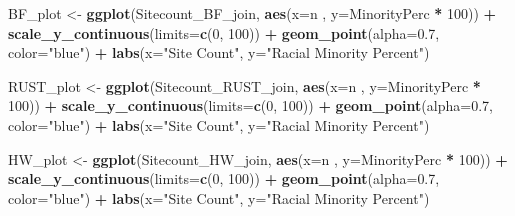 \documentclass[12pt,]{article}
\newenvironment{Shaded}{\begin{snugshade}}{\end{snugshade}}
\newcommand{\KeywordTok}[1]{\textcolor[rgb]{0.13,0.29,0.53}{\textbf{#1}}}
\newcommand{\DataTypeTok}[1]{\textcolor[rgb]{0.13,0.29,0.53}{#1}}
\newcommand{\DecValTok}[1]{\textcolor[rgb]{0.00,0.00,0.81}{#1}}
\newcommand{\FloatTok}[1]{\textcolor[rgb]{0.00,0.00,0.81}{#1}}
\newcommand{\StringTok}[1]{\textcolor[rgb]{0.31,0.60,0.02}{#1}}
\newcommand{\OperatorTok}[1]{\textcolor[rgb]{0.81,0.36,0.00}{\textbf{#1}}}
\newcommand{\NormalTok}[1]{#1}
\begin{document}
\begin{Shaded}
\begin{Highlighting}[]
\NormalTok{BF_plot <-}\StringTok{ }
\StringTok{  }\KeywordTok{ggplot}\NormalTok{(Sitecount_BF_join, }\KeywordTok{aes}\NormalTok{(}\DataTypeTok{x=}\NormalTok{n , }\DataTypeTok{y=}\NormalTok{MinorityPerc }\OperatorTok{*}\StringTok{ }\DecValTok{100}\NormalTok{)) }\OperatorTok{+}
\StringTok{  }\KeywordTok{scale_y_continuous}\NormalTok{(}\DataTypeTok{limits=}\KeywordTok{c}\NormalTok{(}\DecValTok{0}\NormalTok{, }\DecValTok{100}\NormalTok{)) }\OperatorTok{+}
\StringTok{  }\KeywordTok{geom_point}\NormalTok{(}\DataTypeTok{alpha=}\FloatTok{0.7}\NormalTok{, }\DataTypeTok{color=}\StringTok{"blue"}\NormalTok{) }\OperatorTok{+}
\StringTok{  }\KeywordTok{labs}\NormalTok{(}\DataTypeTok{x=}\StringTok{"Site Count"}\NormalTok{, }\DataTypeTok{y=}\StringTok{"Racial Minority Percent"}\NormalTok{)}

\NormalTok{RUST_plot <-}\StringTok{ }
\StringTok{  }\KeywordTok{ggplot}\NormalTok{(Sitecount_RUST_join, }\KeywordTok{aes}\NormalTok{(}\DataTypeTok{x=}\NormalTok{n , }\DataTypeTok{y=}\NormalTok{MinorityPerc }\OperatorTok{*}\StringTok{ }\DecValTok{100}\NormalTok{)) }\OperatorTok{+}
\StringTok{  }\KeywordTok{scale_y_continuous}\NormalTok{(}\DataTypeTok{limits=}\KeywordTok{c}\NormalTok{(}\DecValTok{0}\NormalTok{, }\DecValTok{100}\NormalTok{)) }\OperatorTok{+}
\StringTok{  }\KeywordTok{geom_point}\NormalTok{(}\DataTypeTok{alpha=}\FloatTok{0.7}\NormalTok{, }\DataTypeTok{color=}\StringTok{"blue"}\NormalTok{) }\OperatorTok{+}
\StringTok{  }\KeywordTok{labs}\NormalTok{(}\DataTypeTok{x=}\StringTok{"Site Count"}\NormalTok{, }\DataTypeTok{y=}\StringTok{"Racial Minority Percent"}\NormalTok{)}

\NormalTok{HW_plot <-}\StringTok{ }
\StringTok{  }\KeywordTok{ggplot}\NormalTok{(Sitecount_HW_join, }\KeywordTok{aes}\NormalTok{(}\DataTypeTok{x=}\NormalTok{n , }\DataTypeTok{y=}\NormalTok{MinorityPerc }\OperatorTok{*}\StringTok{ }\DecValTok{100}\NormalTok{)) }\OperatorTok{+}
\StringTok{  }\KeywordTok{scale_y_continuous}\NormalTok{(}\DataTypeTok{limits=}\KeywordTok{c}\NormalTok{(}\DecValTok{0}\NormalTok{, }\DecValTok{100}\NormalTok{)) }\OperatorTok{+}
\StringTok{  }\KeywordTok{geom_point}\NormalTok{(}\DataTypeTok{alpha=}\FloatTok{0.7}\NormalTok{, }\DataTypeTok{color=}\StringTok{"blue"}\NormalTok{) }\OperatorTok{+}
\StringTok{  }\KeywordTok{labs}\NormalTok{(}\DataTypeTok{x=}\StringTok{"Site Count"}\NormalTok{, }\DataTypeTok{y=}\StringTok{"Racial Minority Percent"}\NormalTok{)}
\end{Highlighting}
\end{Shaded}
\end{document}
